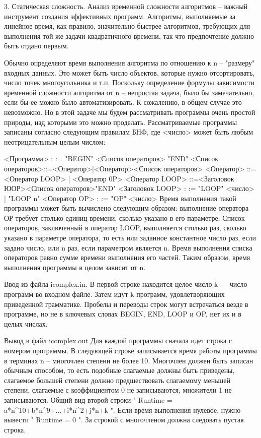 \documentclass[]{article}
\begin{document}
3. Статическая сложность. Анализ временной сложности алгоритмов – важный инструмент создания эффективных программ. Алгоритмы, выполняемые за линейное время, как правило, значительно быстрее алгоритмов, требующих для выполнения той же задачи квадратичного времени, так что предпочтение должно быть отдано первым.

Обычно определяют время выполнения алгоритма по отношению к n – "размеру" входных данных. Это может быть число объектов, которые нужно отсортировать, число точек многоугольника и т.п. Поскольку определение формулы зависимости временной сложности алгоритма от n – непростая задача, было бы замечательно, если бы ее можно было автоматизировать. К сожалению, в общем случае это невозможно. Но в этой задаче мы будем рассматривать программы очень простой природы, над которыми это можно проделать. Рассматриваемые программы записаны согласно следующим правилам БНФ, где <число> может быть любым неотрицательным целым числом:

<Программа> : := "BEGIN" <Список операторов> "END" 
<Список операторов>::=<Оператор>|<Оператор><Список операторов> 
<Оператор> ::=<Оператор LOOP> | <Оператор 0P> 
<Оператор LOOP> ::=<Заголовок ЮОР><Список операторов>"END" 
<Заголовок LOOP> : := "LOOP" <число> | "LOOP n" 
<Оператор OP> : := "OP" <число>
Время выполнения такой программы может быть вычислено следующим образом: выполнение оператора ОР требует столько единиц времени, сколько указано в его параметре. Список операторов, заключенный в оператор LOOP, выполняется столько раз, сколько указано в параметре оператора, то есть или заданное константное число раз, если задано число, или n раз, если параметром является n. Время выполнения списка операторов равно сумме времени выполнения его частей. Таким образом, время выполнения программы в целом зависит от n.

Ввод из файла icomplex.in. В первой строке находится целое число k — число программ во входном файле. Затем идут k программ, удовлетворяющих приведенной грамматике. Пробелы и переводы строк могут встречаться везде в программе, но не в ключевых словах BEGIN, END, LOOP и OP, нет их и в целых числах.

Вывод в файл icomplex.out Для каждой программы сначала идет строка с номером программы. В следующей строке записывается время работы программы в терминах n – многочлен степени не более 10. Многочлен должен быть записан обычным способом, то есть подобные слагаемые должны быть приведены, слагаемое большей степени должно предшествовать слагаемому меньшей степени, слагаемые с коэффициентом 0 не записываются, множители 1 не записываются. Общий вид второй строки " Runtime = a*n^10+b*n^9+...+i*n^2+j*n+k ". Если время выполнения нулевое, нужно вывести " Runtime = 0 ". За строкой с многочленом должна следовать пустая строка.
\end{document}
